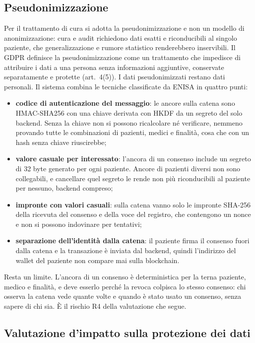 \subsection{Pseudonimizzazione}\label{sec:pseudonimi}
Per il trattamento di cura si adotta la pseudonimizzazione e non un modello di anonimizzazione: cura e audit richiedono dati esatti e riconducibili al singolo paziente, che generalizzazione e rumore statistico renderebbero inservibili. Il GDPR definisce la pseudonimizzazione come un trattamento che impedisce di attribuire i dati a una persona senza informazioni aggiuntive, conservate separatamente e protette (art.~4(5)). I dati pseudonimizzati restano dati personali\cite{wp216}. Il sistema combina le tecniche classificate da ENISA\cite{enisa-pseudo} in quattro punti:
\begin{itemize}
  \item \textbf{codice di autenticazione del messaggio}: le ancore sulla catena sono HMAC-SHA256 con una chiave derivata con HKDF da un segreto del solo backend. Senza la chiave non si possono ricalcolare né verificare, nemmeno provando tutte le combinazioni di pazienti, medici e finalità, cosa che con un hash senza chiave riuscirebbe;
  \item \textbf{valore casuale per interessato}: l'ancora di un consenso include un segreto di 32 byte generato per ogni paziente. Ancore di pazienti diversi non sono collegabili, e cancellare quel segreto le rende non più riconducibili al paziente per nessuno, backend compreso;
  \item \textbf{impronte con valori casuali}: sulla catena vanno solo le impronte SHA-256 della ricevuta del consenso e della voce del registro, che contengono un nonce e non si possono indovinare per tentativi;
  \item \textbf{separazione dell'identità dalla catena}: il paziente firma il consenso fuori dalla catena e la transazione è inviata dal backend, quindi l'indirizzo del wallet del paziente non compare mai sulla blockchain.
\end{itemize}
Resta un limite. L'ancora di un consenso è deterministica per la terna paziente, medico e finalità, e deve esserlo perché la revoca colpisca lo stesso consenso: chi osserva la catena vede quante volte e quando è stato usato un consenso, senza sapere di chi sia. È il rischio R4 della valutazione che segue.

\subsection{Valutazione d'impatto sulla protezione dei dati}\label{sec:dpia}

